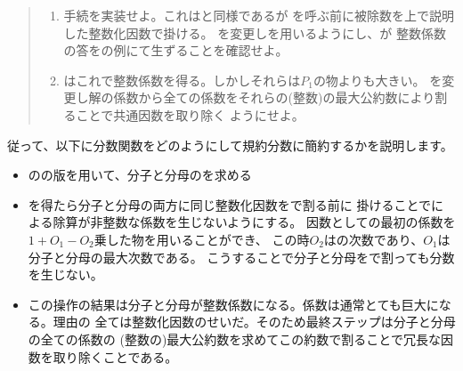 \begin{quote}
\begin{enumerate}[a]

\item
手続を実装せよ。これはと同様であるが
を呼ぶ前に被除数を上で説明した整数化因数で掛ける。
を変更しを用いるようにし、が
整数係数の答をの例にて生ずることを確認せよ。

\item
{}はこれで整数係数を得る。しかしそれらは\( P_1 \)の物よりも大きい。
を変更し解の係数から全ての係数をそれらの(整数)の最大公約数により割ることで共通因数を取り除く
ようにせよ。
\end{enumerate}
\end{quote}

\noindent
従って、以下に分数関数をどのようにして規約分数に簡約するかを説明します。

\begin{itemize}

\item
{}のの版を用いて、分子と分母のを求める

\item
{}を得たら分子と分母の両方に同じ整数化因数をで割る前に
掛けることでによる除算が非整数な係数を生じないようにする。
因数としての最初の係数を\( 1 + O_1 - O_2 \)乗した物を用いることができ、
この時\( O_2 \)はの次数であり、\( O_1 \)は分子と分母の最大次数である。
こうすることで分子と分母をで割っても分数を生じない。

\item
この操作の結果は分子と分母が整数係数になる。係数は通常とても巨大になる。理由の
全ては整数化因数のせいだ。そのため最終ステップは分子と分母の全ての係数の
(整数の)最大公約数を求めてこの約数で割ることで冗長な因数を取り除くことである。

\end{itemize}

